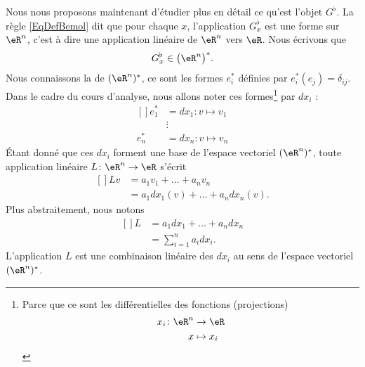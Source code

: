Nous nous proposons maintenant d'étudier plus en détail ce qu'est l'objet $G^{\flat}$. La règle \eqref{EqDefBemol} dit que pour chaque $x$, l'application $G_x^{\flat}$ est une forme sur $\eR^n$, c'est à dire une application linéaire de $\eR^n$ vers $\eR$. Nous écrivons que
\begin{equation}
	G_x^{\flat}\in\big( \eR^n \big)^*.
\end{equation}
Nous connaissons la  de $(\eR^n)^*$, ce sont les formes $e^*_i$ définies par $e^*_i(e_j)=\delta_{ij}$. Dans le cadre du cours d'analyse, nous allons noter ces formes\footnote{Parce que ce sont les différentielles des fonctions (projections)
\begin{equation}
	\begin{aligned}
			x_i\colon \eR^n&\to \eR \\
			x&\mapsto x_i 
		\end{aligned}
	\end{equation}
}
par $dx_i$ :
\begin{equation}
	\begin{aligned}[]
		e^*_1&=dx_1\colon v\mapsto v_1	\\
			&\vdots			\\
		e^*_n&=dx_n\colon v\mapsto v_n
	\end{aligned}
\end{equation}
Étant donné que ces $dx_i$ forment une base de l'espace vectoriel $(\eR^n)^*$, toute application linéaire $L\colon \eR^n\to \eR$ s'écrit
\begin{equation}
	\begin{aligned}[]
		Lv&=a_1v_1+\ldots+a_nv_n\\
			&=a_1dx_1(v)+\ldots+a_ndx_n(v).
	\end{aligned}
\end{equation}
Plus abstraitement, nous notons
\begin{equation}
	\begin{aligned}[]
		L&=a_1dx_1+\ldots+a_ndx_n\\
		&=\sum_{i=1}^na_idx_i.
	\end{aligned}
\end{equation}
L'application $L$ est une combinaison linéaire des $dx_i$ au sens de l'espace vectoriel $(\eR^n)^*$.

